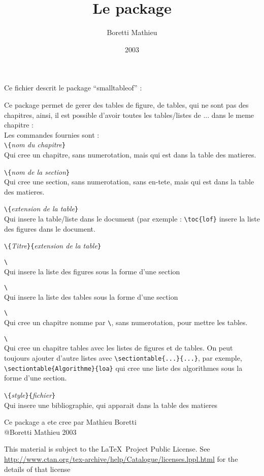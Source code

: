 \documentclass[pagesize=auto, fontsize=12pt, DIV=10, parskip=full, american, french]{scrartcl}
\title{Le package \pkg{smalltableof}}
\author{Boretti Mathieu }
\date{2003}
\makeatletter
\newcommand*{\pkg}[1]{\textsf{#1}}
\newcommand*{\cs}[1]{\texttt{\textbackslash#1}}
\newcommand*{\cmd}[1]{\cs{\expandafter\@gobble\string#1}}
\newcommand*{\meta}[1]{\textlangle\textsl{#1}\textrangle}
\newcommand*{\marg}[1]{\texttt{\{}\meta{#1}\texttt{\}}}
\makeatother
\begin{document}
\maketitle

Ce fichier descrit le package \enquote{\pkg{smalltableof}} :

Ce package permet de gerer des tables de figure, de tables, qui ne sont pas des chapitres, ainsi, il est possible d'avoir toutes les tables/listes de ... dans le meme chapitre :\\
Les commandes fournies sont :\\
\cmd{\chapterNoNumber}\marg{nom du chapitre}\\
Qui cree un chapitre, sans numerotation, mais qui est dans la table des matieres.

\cmd{\sectionNoNumber}\marg{nom de la section}\\
Qui cree une section, sans numerotation, sans en-tete, mais qui est dans la table des matieres.

\cmd{\toc}\marg{extension de la table}\\
Qui insere la table/liste dans le document (par exemple : \verb|\toc{lof}| insere la liste des figures dans le document.

\cmd{\sectiontable}\marg{Titre}\marg{extension de la table}

\cmd{\sectiontableoffigure}\\
Qui insere la liste des figures sous la forme d'une section

\cmd{\sectiontableoftable}\\
Qui insere la liste des tables sous la forme d'une section

\cmd{\tablechapter}\\
Qui cree un chapitre nomme par \cmd{\tablesname}, sans numerotation, pour mettre les tables.

\begin{sloppypar}
  \cmd{\stdtables}\\
  Qui cree un chapitre tables avec les listes de figures et de tables. On peut toujours ajouter d'autre listes avec \verb|\sectiontable{...}{...}|, par exemple, \verb|\sectiontable{Algorithme}{loa}| qui cree une liste des algorithmes sous la forme d'une section.
\end{sloppypar}

\cmd{\mabibliographie}\marg{style}\marg{fichier}\\
Qui insere une bibliographie, qui apparait dans la table des matieres

Ce package a ete cree par Mathieu Boretti\\
@Boretti Mathieu 2003

This material is subject to the \LaTeX\ Project Public License. See \url{http://www.ctan.org/tex-archive/help/Catalogue/licenses.lppl.html} for the details of that license
\end{document}
